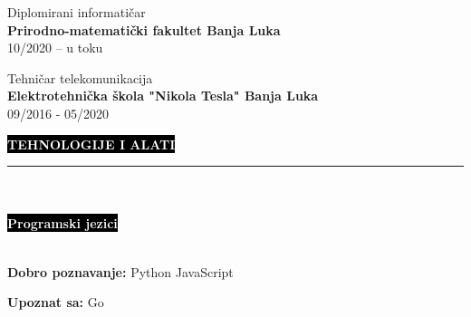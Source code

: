 \documentclass[9pt]{developercv} %
\begin{document}
    {\huge Diplomirani informatičar \smallskip}\\
    {\textbf{Prirodno-matematički fakultet Banja Luka}}\\
    {\faCalendarCheckO \space}{10/2020 -- u toku}\\
    
    \vspace{0.3cm}
    
	{\huge Tehničar telekomunikacija \smallskip}\\
    {\textbf{Elektrotehnička škola "Nikola Tesla" Banja Luka}}\\
    {\faCalendarCheckO \space}{09/2016 - 05/2020}\\

\vspace{0.8cm}




\colorbox{black}{{\textcolor{white}{\textbf{\MakeUppercase{Tehnologije i alati}}}}}
\par\noindent\rule{\textwidth}{2px}\\\\
\colorbox{black}{{\textcolor{white}{\textbf{Programski jezici}}}}\smallskip\\\\
\begin{minipage}[t]{0.5\textwidth}
	\vspace{-\baselineskip}
	
	\textbf{Dobro poznavanje:} \hspace{10} {Python} \hspace{10} {JavaScript}\smallskip
\end{minipage}
\hfill
\begin{minipage}[t]{0.5\textwidth}
	\vspace{-\baselineskip}
	
	\textbf{Upoznat sa:}  \hspace{10} {Go}
\end{minipage}

\vspace{0.8cm}
\end{document}
